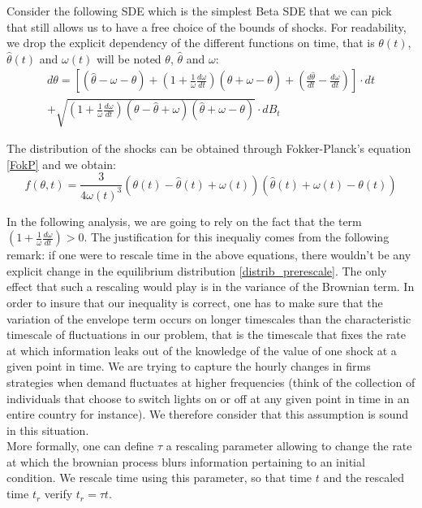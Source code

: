 Consider the following SDE which is the simplest Beta SDE that we can pick that still allows us to have a free choice of the bounds of shocks. For readability, we drop the explicit dependency of the different functions on time, that is $\theta(t)$, $\hat{\theta}(t)$ and $\omega(t)$ will be noted $\theta$, $\hat{\theta}$ and $\omega$:
\begin{equation}
\begin{split}
  d\theta=\left[(\hat{\theta}-\omega-\theta)+\left(1+\frac{1}{\omega}\frac{d\omega}{dt}\right)(\hat{\theta}+\omega-\theta)+\left(\frac{d\hat{\theta}}{dt}-\frac{d\omega}{dt}\right)\right]\cdot dt\\+\sqrt{\left(1+\frac{1}{\omega}\frac{d\omega}{dt}\right)(\theta-\hat{\theta}+\omega)(\hat{\theta}+\omega-\theta)}\cdot dB_{t}
\end{split}
\end{equation}

The distribution of the shocks can be obtained through Fokker-Planck's equation \ref{FokP} and we obtain:
\begin{equation}
f(\theta,t)=\frac{3}{4\omega(t)^3}(\theta(t)-\hat{\theta}(t)+\omega(t))(\hat{\theta}(t)+\omega(t)-\theta(t))
\label{distrib_prerescale}
\end{equation}

In the following analysis, we are going to rely on the fact that the term $\left(1+\frac{1}{\omega}\frac{d\omega}{dt}\right)>0$. The justification for this inequaliy comes from the following remark: if one were to rescale time in the above equations, there wouldn't be any explicit change in the equilibrium distribution \ref{distrib_prerescale}. The only effect that such a rescaling would play is in the variance of the Brownian term. In order to insure that our inequality is correct, one has to make sure that the variation of the envelope term occurs on longer timescales than the characteristic timescale of fluctuations in our problem, that is the timescale that fixes the rate at which information leaks out of the knowledge of the value of one shock at a given point in time. We are trying to capture the hourly changes in firms strategies when demand fluctuates at higher frequencies (think of the collection of individuals that choose to switch lights on or off at any given point in time in an entire country for instance). We therefore consider that this assumption is sound in this situation.\\

More formally, one can define $\tau$ a rescaling parameter allowing to change the rate at which the brownian process blurs information pertaining to an initial condition. We rescale time using this parameter, so that time $t$ and the rescaled time $t_r$ verify $t_r=\tau t$. \\

